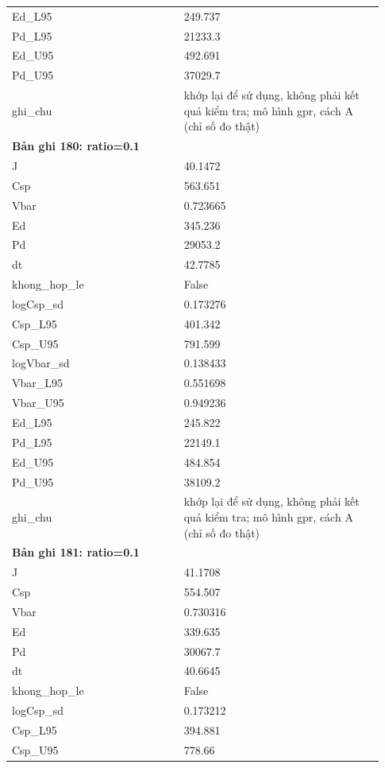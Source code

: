 \begin{longtable}{p{0.43\linewidth}p{0.50\linewidth}}
Ed\_\allowbreak L95 & 249.737 \\
Pd\_\allowbreak L95 & 21233.3 \\
Ed\_\allowbreak U95 & 492.691 \\
Pd\_\allowbreak U95 & 37029.7 \\
ghi\_\allowbreak chu & khớp lại để sử dụng, không phải kết quả kiểm tra; mô hình gpr, cách A (chỉ số đo thật) \\
\midrule
\multicolumn{2}{p{0.95\linewidth}}{\textbf{Bản ghi 180: ratio=0.1}} \\
J & 40.1472 \\
Csp & 563.651 \\
Vbar & 0.723665 \\
Ed & 345.236 \\
Pd & 29053.2 \\
dt & 42.7785 \\
khong\_\allowbreak hop\_\allowbreak le & False \\
logCsp\_\allowbreak sd & 0.173276 \\
Csp\_\allowbreak L95 & 401.342 \\
Csp\_\allowbreak U95 & 791.599 \\
logVbar\_\allowbreak sd & 0.138433 \\
Vbar\_\allowbreak L95 & 0.551698 \\
Vbar\_\allowbreak U95 & 0.949236 \\
Ed\_\allowbreak L95 & 245.822 \\
Pd\_\allowbreak L95 & 22149.1 \\
Ed\_\allowbreak U95 & 484.854 \\
Pd\_\allowbreak U95 & 38109.2 \\
ghi\_\allowbreak chu & khớp lại để sử dụng, không phải kết quả kiểm tra; mô hình gpr, cách A (chỉ số đo thật) \\
\midrule
\multicolumn{2}{p{0.95\linewidth}}{\textbf{Bản ghi 181: ratio=0.1}} \\
J & 41.1708 \\
Csp & 554.507 \\
Vbar & 0.730316 \\
Ed & 339.635 \\
Pd & 30067.7 \\
dt & 40.6645 \\
khong\_\allowbreak hop\_\allowbreak le & False \\
logCsp\_\allowbreak sd & 0.173212 \\
Csp\_\allowbreak L95 & 394.881 \\
Csp\_\allowbreak U95 & 778.66 \\

\end{longtable}
